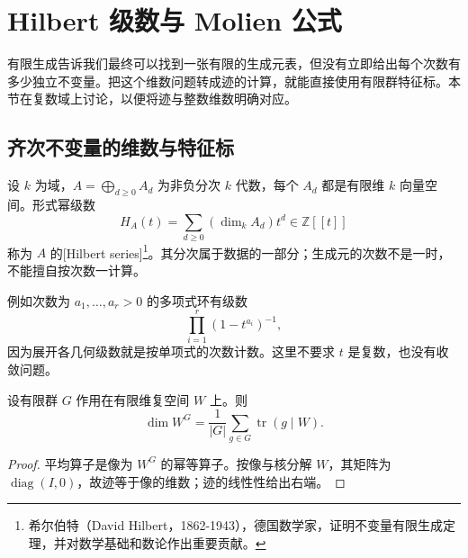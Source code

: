 %
%
\section{Hilbert 级数与 Molien 公式}
\label{b5:sec:2203}

有限生成告诉我们最终可以找到一张有限的生成元表，但没有立即给出每个次数有多少独立不变量。把这个维数问题转成迹的计算，就能直接使用有限群特征标。本节在复数域上讨论，以便将迹与整数维数明确对应。

\subsection{齐次不变量的维数与特征标}
\label{b5:subsec:2203:01}

\begin{definition}\label{b5:def:invariant-hilbert-series}
	设 \(k\) 为域，\(A=\bigoplus_{d\ge0}A_d\) 为非负分次 \(k\) 代数，每个 \(A_d\) 都是有限维 \(k\) 向量空间。形式幂级数
	\[
		H_A(t)=\sum_{d\ge0}(\dim_k A_d)t^d\in\mathbb Z[\![t]\!]
	\]
	称为 \(A\) 的[Hilbert series]\footnote{希尔伯特（David Hilbert，1862-1943），德国数学家，证明不变量有限生成定理，并对数学基础和数论作出重要贡献。}。其分次属于数据的一部分；生成元的次数不是一时，不能擅自按次数一计算。
\end{definition}

例如次数为 \(a_1,\ldots,a_r>0\) 的多项式环有级数
\[
	\prod_{i=1}^r(1-t^{a_i})^{-1},
\]
因为展开各几何级数就是按单项式的次数计数。这里不要求 \(t\) 是复数，也没有收敛问题。

\begin{lemma}\label{b5:lem:invariant-dimension-trace}
	设有限群 \(G\) 作用在有限维复空间 \(W\) 上。则
	\[
		\dim W^G=\frac1{|G|}\sum_{g\in G}\operatorname{tr}(g\mid W).
	\]
\end{lemma}
\begin{proof}
	平均算子是像为 \(W^G\) 的幂等算子。按像与核分解 \(W\)，其矩阵为 \(\operatorname{diag}(I,0)\)，故迹等于像的维数；迹的线性性给出右端。
\end{proof}

